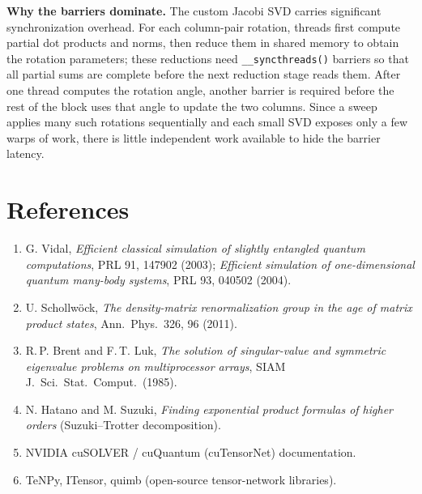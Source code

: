 \documentclass[11pt]{article}
\newcommand{\code}[1]{\texttt{#1}}
\begin{document}
\smallskip
\noindent\textbf{Why the barriers dominate.} The custom Jacobi SVD carries significant synchronization overhead. For each column-pair rotation, threads first compute partial dot products and norms, then reduce them in shared memory to obtain the rotation parameters; these reductions need \code{\_\_syncthreads()} barriers so that all partial sums are complete before the next reduction stage reads them. After one thread computes the rotation angle, another barrier is required before the rest of the block uses that angle to update the two columns. Since a sweep applies many such rotations sequentially and each small SVD exposes only a few warps of work, there is little independent work available to hide the barrier latency.



\newpage
\section*{References}

\begin{enumerate}
\item G. Vidal, \emph{Efficient classical simulation of slightly entangled quantum
  computations}, PRL 91, 147902 (2003); \emph{Efficient simulation of one-dimensional
  quantum many-body systems}, PRL 93, 040502 (2004).
\item U. Schollw{\"o}ck, \emph{The density-matrix renormalization group in the age of matrix
  product states}, Ann.\ Phys.\ 326, 96 (2011).
\item R.\,P. Brent and F.\,T. Luk, \emph{The solution of singular-value and symmetric
  eigenvalue problems on multiprocessor arrays}, SIAM J.\ Sci.\ Stat.\ Comput.\ (1985).
\item N. Hatano and M. Suzuki, \emph{Finding exponential product formulas of higher
  orders} (Suzuki--Trotter decomposition).
\item NVIDIA cuSOLVER / cuQuantum (cuTensorNet) documentation.
\item TeNPy, ITensor, quimb (open-source tensor-network libraries).
\end{enumerate}
\end{document}
